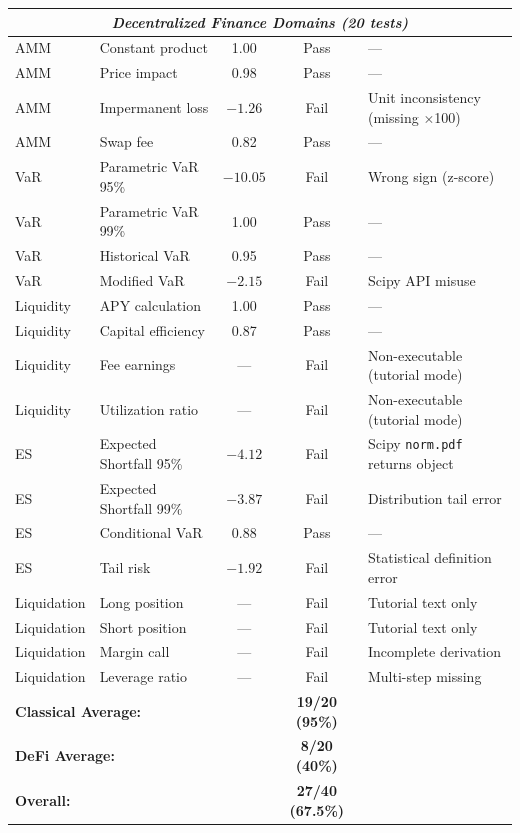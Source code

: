 \documentclass[twoside,11pt]{article}
\begin{document}
\begin{table}[H]
\begin{small}
\begin{tabular}{@{}llccp{4.5cm}@{}}
\midrule
\multicolumn{5}{c}{\textit{Decentralized Finance Domains (20 tests)}} \\
\midrule
AMM & Constant product & 1.00 & Pass & --- \\
AMM & Price impact & 0.98 & Pass & --- \\
AMM & Impermanent loss & $-1.26$ & Fail & Unit inconsistency (missing $\times$100) \\
AMM & Swap fee & 0.82 & Pass & --- \\
VaR & Parametric VaR 95\% & $-10.05$ & Fail & Wrong sign (z-score) \\
VaR & Parametric VaR 99\% & 1.00 & Pass & --- \\
VaR & Historical VaR & 0.95 & Pass & --- \\
VaR & Modified VaR & $-2.15$ & Fail & Scipy API misuse \\
Liquidity & APY calculation & 1.00 & Pass & --- \\
Liquidity & Capital efficiency & 0.87 & Pass & --- \\
Liquidity & Fee earnings & --- & Fail & Non-executable (tutorial mode) \\
Liquidity & Utilization ratio & --- & Fail & Non-executable (tutorial mode) \\
ES & Expected Shortfall 95\% & $-4.12$ & Fail & Scipy \texttt{norm.pdf} returns object \\
ES & Expected Shortfall 99\% & $-3.87$ & Fail & Distribution tail error \\
ES & Conditional VaR & 0.88 & Pass & --- \\
ES & Tail risk & $-1.92$ & Fail & Statistical definition error \\
Liquidation & Long position & --- & Fail & Tutorial text only \\
Liquidation & Short position & --- & Fail & Tutorial text only \\
Liquidation & Margin call & --- & Fail & Incomplete derivation \\
Liquidation & Leverage ratio & --- & Fail & Multi-step missing \\
\midrule
\multicolumn{3}{l}{\textbf{Classical Average:}} & \textbf{19/20 (95\%)} & \\
\multicolumn{3}{l}{\textbf{DeFi Average:}} & \textbf{8/20 (40\%)} & \\
\multicolumn{3}{l}{\textbf{Overall:}} & \textbf{27/40 (67.5\%)} & \\
\bottomrule
\end{tabular}
\end{small}
\end{table}
\end{document}
